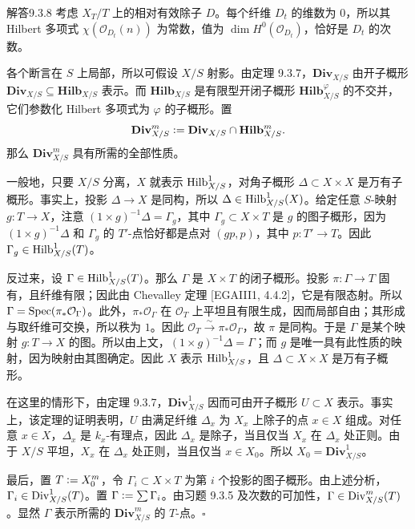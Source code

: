 \begin{origstatement}{解答}{9.3.8}\label{appA:ans938}
考虑 $X_T/T$ 上的相对有效除子 $D$。每个纤维 $D_t$ 的维数为 $0$，所以其 Hilbert 多项式 $\chi(\mathcal O_{D_t}(n))$ 为常数，值为 $\dim H^0(\mathcal O_{D_t})$，恰好是 $D_t$ 的次数。

各个断言在 $S$ 上局部，所以可假设 $X/S$ 射影。由定理 9.3.7，$\mathbf{Div}_{X/S}$ 由开子概形 $\mathbf{Div}_{X/S}\subseteq\mathbf{Hilb}_{X/S}$ 表示。而 $\mathbf{Hilb}_{X/S}$ 是有限型开闭子概形 $\mathbf{Hilb}_{X/S}^{\varphi}$ 的不交并，它们参数化 Hilbert 多项式为 $\varphi$ 的子概形。置
\[
 \mathbf{Div}_{X/S}^m\mathrel{\mathop:}=\mathbf{Div}_{X/S}\cap\mathbf{Hilb}_{X/S}^m.
\]
那么 $\mathbf{Div}_{X/S}^m$ 具有所需的全部性质。

一般地，只要 $X/S$ 分离，$X$ 就表示 $\operatorname{Hilb}_{X/S}^1$，对角子概形 $\Delta\subset X\times X$ 是万有子概形。事实上，投影 $\Delta\to X$ 是同构，所以 $\Delta\in\operatorname{Hilb}_{X/S}^1(X)$。给定任意 $S$-映射 $g\colon T\to X$，注意 $(1\times g)^{-1}\Delta=\Gamma_g$，其中 $\Gamma_g\subset X\times T$ 是 $g$ 的图子概形，因为 $(1\times g)^{-1}\Delta$ 和 $\Gamma_g$ 的 $T'$-点恰好都是点对 $(gp,p)$，其中 $p\colon T'\to T$。因此 $\Gamma_g\in\operatorname{Hilb}_{X/S}^1(T)$。

反过来，设 $\Gamma\in\operatorname{Hilb}_{X/S}^1(T)$。那么 $\Gamma$ 是 $X\times T$ 的闭子概形。投影 $\pi\colon\Gamma\to T$ 固有，且纤维有限；因此由 Chevalley 定理 [EGAIII1, 4.4.2]，它是有限态射。所以 $\Gamma=\operatorname{Spec}(\pi_*\mathcal O_\Gamma)$。此外，$\pi_*\mathcal O_\Gamma$ 在 $\mathcal O_T$ 上平坦且有限生成，因而局部自由；其形成与取纤维可交换，所以秩为 $1$。因此 $\mathcal O_T\xrightarrow{\sim}\pi_*\mathcal O_\Gamma$，故 $\pi$ 是同构。于是 $\Gamma$ 是某个映射 $g\colon T\to X$ 的图。所以由上文，$(1\times g)^{-1}\Delta=\Gamma$；而 $g$ 是唯一具有此性质的映射，因为映射由其图确定。因此 $X$ 表示 $\operatorname{Hilb}_{X/S}^1$，且 $\Delta\subset X\times X$ 是万有子概形。

在这里的情形下，由定理 9.3.7，$\mathbf{Div}_{X/S}^1$ 因而可由开子概形 $U\subset X$ 表示。事实上，该定理的证明表明，$U$ 由满足纤维 $\Delta_x$ 为 $X_x$ 上除子的点 $x\in X$ 组成。对任意 $x\in X$，$\Delta_x$ 是 $k_x$-有理点，因此 $\Delta_x$ 是除子，当且仅当 $X_x$ 在 $\Delta_x$ 处正则。由于 $X/S$ 平坦，$X_x$ 在 $\Delta_x$ 处正则，当且仅当 $x\in X_0$。所以 $X_0=\mathbf{Div}_{X/S}^1$。

最后，置 $T\mathrel{\mathop:}= X_0^m$，令 $\Gamma_i\subset X\times T$ 为第 $i$ 个投影的图子概形。由上述分析，$\Gamma_i\in\operatorname{Div}_{X/S}^1(T)$。置 $\Gamma\mathrel{\mathop:}=\sum\Gamma_i$。由习题 9.3.5 及次数的可加性，$\Gamma\in\operatorname{Div}_{X/S}^m(T)$。显然 $\Gamma$ 表示所需的 $\mathbf{Div}_{X/S}^m$ 的 $T$-点。\hfill$\square$
\end{origstatement}

